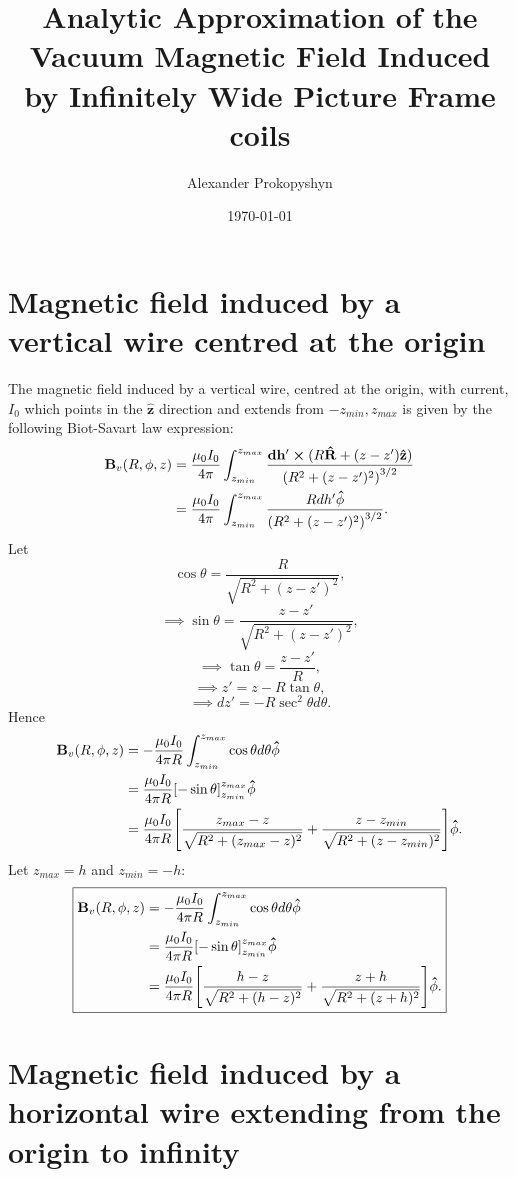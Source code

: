 \documentclass{article}
\title{Analytic Approximation of the Vacuum Magnetic Field Induced by Infinitely Wide Picture Frame coils}
\author{Alexander Prokopyshyn}
\date{\today}
\let\vec\mathbf
\begin{document}
\maketitle

\section{Magnetic field induced by a vertical wire centred at the origin}
\label{sec:vertical_wire_at_origin}

The magnetic field induced by a vertical wire, centred at the origin, with current, \(I_0\) which points in the 
\(\vec{\hat{z}}\) direction and extends from \(-z_{min}, z_{max}\) is given by the following Biot-Savart law expression:
\[\begin{aligned}
    \vec{B}_{v}(R, \phi, z) &= \frac{\mu_0 I_0}{4\pi}\int_{z_{min}}^{z_{max}}\frac{\vec{dh'}\cross(R\vec{\hat{R}} + (z-z')\vec{\hat{z}})}{\qty(R^2+(z-z')^2)^{3/2}} \\
    &= \frac{\mu_0 I_0}{4\pi}\int_{z_{min}}^{z_{max}}\frac{Rdh'\vec{\hat{\phi}}}{\qty(R^2+(z-z')^2)^{3/2}}.
\end{aligned}
\]
Let
\[\cos\theta = \frac{R}{\sqrt{R^2+(z-z')^2}},\]
\[\implies \sin\theta = \frac{z-z'}{\sqrt{R^2+(z-z')^2}},\]
\[\implies \tan \theta = \frac{z-z'}{R},\]
\[\implies z' = z - R\tan\theta,\]
\[\implies dz' = -R\sec^2\theta d\theta.\]
Hence
\[
\begin{aligned}
    \vec{B}_{v}(R, \phi, z) &= -\frac{\mu_0 I_0}{4\pi R}\int_{z_{min}}^{z_{max}}\cos\theta d\theta\vec{\hat{\phi}}\\
    &= \frac{\mu_0 I_0}{4\pi R}\qty[-\sin\theta]_{z_{min}}^{z_{max}}\vec{\hat{\phi}}\\
    &= \frac{\mu_0 I_0}{4\pi R}\qty[\frac{z_{max}-z}{\sqrt{R^2+(z_{max}-z)^2}} + \frac{z-z_{min}}{\sqrt{R^2+(z-z_{min})^2}}]\vec{\hat{\phi}}.
\end{aligned}\]
Let $z_{max}=h$ and $z_{min}=-h$:
\[
\boxed{\begin{aligned}
    \vec{B}_{v}(R, \phi, z) &= -\frac{\mu_0 I_0}{4\pi R}\int_{z_{min}}^{z_{max}}\cos\theta d\theta\vec{\hat{\phi}}\\
    &= \frac{\mu_0 I_0}{4\pi R}\qty[-\sin\theta]_{z_{min}}^{z_{max}}\vec{\hat{\phi}}\\
    &= \frac{\mu_0 I_0}{4\pi R}\qty[\frac{h-z}{\sqrt{R^2+(h-z)^2}} + \frac{z+h}{\sqrt{R^2+(z+h)^2}}]\vec{\hat{\phi}}.
\end{aligned}}\]

\section{Magnetic field induced by a horizontal wire extending from the origin to infinity}
\end{document}
